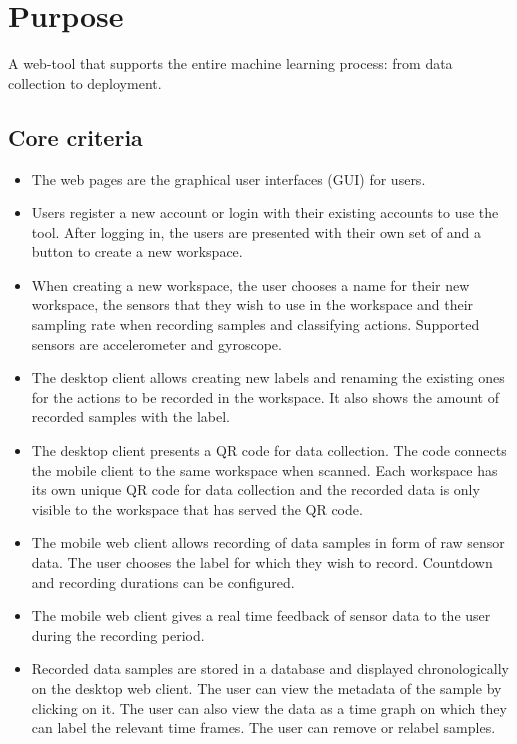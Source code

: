 \section{Purpose}
A web-tool that supports the entire machine learning process: from data collection to  deployment.

\subsection{Core criteria}
\begin{itemize}
    \item The web pages are the \glspl{graphical user interface} (GUI) for users.
    \item Users register a new account or login with their existing accounts to use the tool. After logging in, the users are presented with their own set of  and a button to create a new \gls{workspace}.
    \item When creating a new \gls{workspace}, the user chooses a name for their new \gls{workspace}, the \glspl{sensor} that they wish to use in the \gls{workspace} and their sampling rate when recording samples and classifying actions. Supported \glspl{sensor} are \gls{accelerometer} and \gls{gyroscope}.
    \item The desktop client allows creating new labels and renaming the existing ones for the actions to be recorded in the \gls{workspace}. It also shows the amount of recorded samples with the label. 
    \item The desktop client presents a \gls{QR code} for data collection. The code connects the mobile client to the same \gls{workspace} when scanned. Each \gls{workspace} has its own unique \gls{QR code} for data collection and the recorded data is only visible to the \gls{workspace} that has served the \gls{QR code}.
    \item The mobile web client allows recording of \gls{data sample}s in form of raw \gls{sensor} data. The user chooses the \gls{label} for which they wish to record. Countdown and recording durations can be configured.
    \item The mobile web client gives a real time feedback of \gls{sensor} data to the user during the recording period.
    \item Recorded \gls{data sample}s are stored in a \gls{database} and displayed chronologically on the desktop web client. The user can view the \gls{metadata} of the sample by clicking on it. The user can also view the data as a time graph on which they can \gls{label} the relevant time frames. The user can remove or relabel samples.

\end{itemize}
